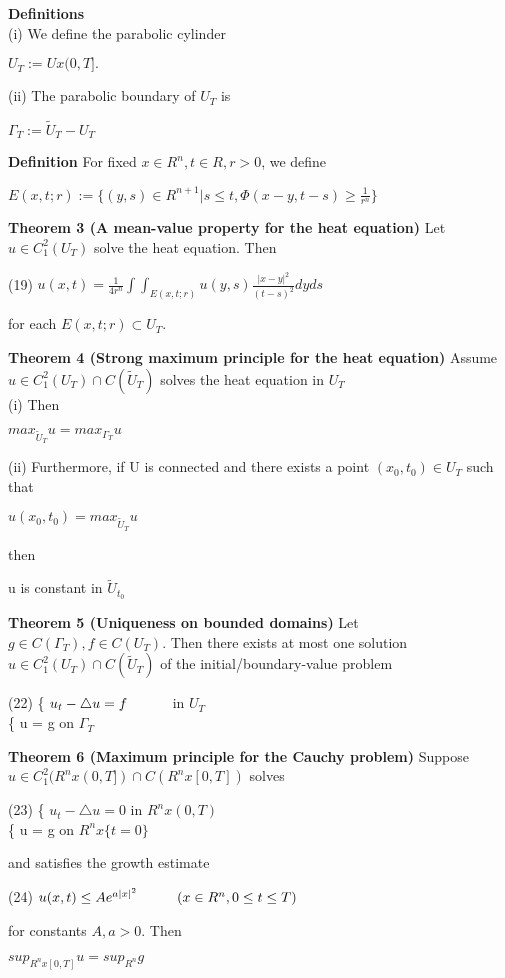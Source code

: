 \documentclass{article}
\newcommand\tab[1][1cm]{\hspace*{#1}}
\begin{document}
\textbf {Definitions} \\
(i) We define the parabolic cylinder
\begin{center}
$U_T := U x (0, T].$
\end{center}
(ii) The parabolic boundary of $U_T$ is 
\begin{center}
$\Gamma_T := \tilde{U}_T - U_T$
\end{center}

\textbf {Definition} For fixed $x \in R^n, t \in R, r > 0$, we define
\begin{center}
$E(x,t;r) := \{ (y,s) \in R^{n+1} | s \leq t, \Phi(x-y, t-s) \geq \frac{1}{r^n} \}$
\end{center}

\textbf {Theorem 3 (A mean-value property for the heat equation)} Let $u \in C^2_1 (U_T)$ solve the heat equation. Then
\begin{center}
(19) \tab $u(x,t) = \frac{1}{4r^n} \int \int_{E(x,t;r)} u(y,s) \frac{|x-y|^2}{(t-s)^2} dyds$
\end{center}
for each $E(x,t;r) \subset U_T$.

\textbf {Theorem 4 (Strong maximum principle for the heat equation)} Assume $u \in C_1^2(U_T) \cap C(\tilde{U}_T)$ solves the heat equation in $U_T$ \\
\tab (i) Then
\begin{center}
$max_{\tilde{U}_T} u = max_{\Gamma_T} u$
\end{center}
(ii) Furthermore, if U is connected and there exists a point $(x_0, t_0) \in U_T$ such that 
\begin{center}
$u(x_0, t_0) = max_{\tilde{U}_T} u$
\end{center}
then
\begin{center}
u is constant in $\tilde{U}_{t_0}$
\end{center}

\textbf {Theorem 5 (Uniqueness on bounded domains)} Let $g \in C(\Gamma_T), f \in C(U_T)$. Then there exists at most one solution $u \in C_1^2(U_T) \cap C(\tilde{U}_T)$ of the initial/boundary-value problem
\begin{center}
(22) \tab \{ $u_t - \triangle u = f \tab$ in $U_T$ \\
\tab \{ \tab u = g \tab on $\Gamma_T$
\end{center}

\textbf {Theorem 6 (Maximum principle for the Cauchy problem)} Suppose $u \in C_1^2(R^n x (0,T]) \cap C(R^n x [0, T])$ solves
\begin{center}
(23) \tab \{ $u_t - \triangle u = 0$ \tab in $R^n x (0,T)$ \\
 \tab \{ \tab  u = g \tab on $R^n x \{t = 0\}$
\end{center}
and satisfies the growth estimate
\begin{center}
(24) \tab \tab $u(x,t) \leq Ae^{a|x|^2} \tab (x \in R^n, 0 \leq t \leq T)$
\end{center}
for constants $A, a > 0$. Then
\begin{center}
$sup_{R^n x [0,T]} u = sup_{R^n} g$
\end{center}
\end{document}
